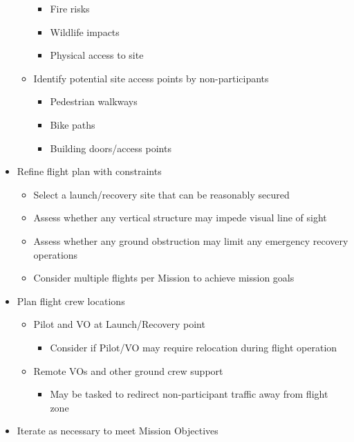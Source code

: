 \documentclass[
]{book}
\providecommand{\tightlist}{%
  \setlength{\itemsep}{0pt}\setlength{\parskip}{0pt}}
\begin{document}
\begin{itemize}
\begin{itemize}
    \begin{itemize}
    \tightlist
    \item
      Fire risks
    \item
      Wildlife impacts
    \item
      Physical access to site
    \end{itemize}
  \item
    Identify potential site access points by non-participants

    \begin{itemize}
    \tightlist
    \item
      Pedestrian walkways
    \item
      Bike paths
    \item
      Building doors/access points
    \end{itemize}
  \end{itemize}
\item
  Refine flight plan with constraints

  \begin{itemize}
  \tightlist
  \item
    Select a launch/recovery site that can be reasonably secured
  \item
    Assess whether any vertical structure may impede visual line of sight
  \item
    Assess whether any ground obstruction may limit any emergency recovery operations
  \item
    Consider multiple flights per Mission to achieve mission goals
  \end{itemize}
\item
  Plan flight crew locations

  \begin{itemize}
  \tightlist
  \item
    Pilot and VO at Launch/Recovery point

    \begin{itemize}
    \tightlist
    \item
      Consider if Pilot/VO may require relocation during flight operation
    \end{itemize}
  \item
    Remote VOs and other ground crew support

    \begin{itemize}
    \tightlist
    \item
      May be tasked to redirect non-participant traffic away from flight zone
    \end{itemize}
  \end{itemize}
\item
  Iterate as necessary to meet Mission Objectives
\end{itemize}
\end{document}
